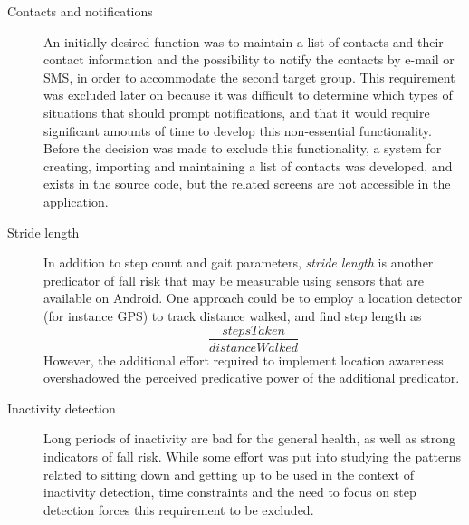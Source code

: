 \begin{description} 
\item[Contacts and notifications] An initially desired function was to maintain a list of contacts and their contact information and the possibility to notify the contacts by e-mail or SMS, in order to accommodate the second target group. This requirement was excluded later on because it was difficult to determine which types of situations that should prompt notifications, and that it would require significant amounts of time to develop this non-essential functionality. Before the decision was made to exclude this functionality, a system for creating, importing and maintaining a list of contacts was developed, and exists in the source code, but the related screens are not accessible in the application.
\item[Stride length] In addition to step count and gait parameters, \emph{stride length} is another predicator of fall risk that may be measurable using sensors that are available on Android. One approach could be to employ a location detector (for instance GPS) to track distance walked, and find step length as $$\frac{stepsTaken}{distanceWalked}$$However, the additional effort required to implement location awareness overshadowed the perceived predicative power of the additional predicator.
\item[Inactivity detection] Long periods of inactivity are bad for the general health, as well as strong indicators of fall risk. While some effort was put into studying the patterns related to sitting down and getting up to be used in the context of inactivity detection, time constraints and the need to focus on step detection forces this requirement to be excluded. 
\end{description} 


